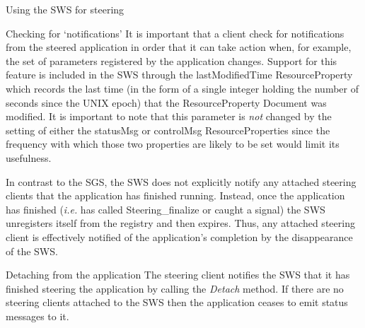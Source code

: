 \documentclass[a4paper]{article}
\begin{document}
\begin{section}{Using the SWS for steering}
\begin{subsection}{Checking for `notifications'}
\label{sec:notification}
It is important that a client check for notifications from the steered
application in order that it can take action when, for example, the
set of parameters registered by the application changes.  Support for
this feature is included in the SWS through the lastModifiedTime
ResourceProperty which records the last time (in the form of a single
integer holding the number of seconds since the UNIX epoch) that the
ResourceProperty Document was modified.  It is important to note that
this parameter is {\em not} changed by the setting of either the
statusMsg or controlMsg ResourceProperties since the frequency with
which those two properties are likely to be set would limit its
usefulness.

In contrast to the SGS, the SWS does not explicitly notify any
attached steering clients that the application has finished running.
Instead, once the application has finished ({\it i.e.} has called
Steering\_finalize or caught a signal) the SWS unregisters itself from
the registry and then expires.  Thus, any attached steering client is
effectively notified of the application's completion by the
disappearance of the SWS.
\end{subsection}

\begin{subsection}{Detaching from the application}
The steering client notifies the SWS that it has finished steering the
application by calling the {\em Detach} method.  If there are no
steering clients attached to the SWS then the application ceases to
emit status messages to it.
\end{subsection}

\end{section}

\end{document}
